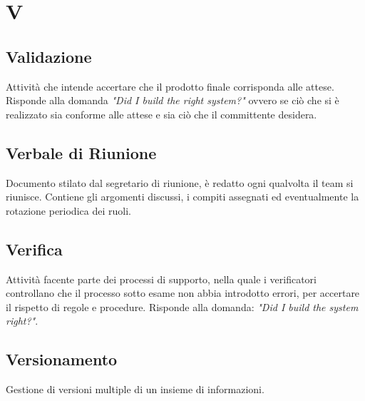 \section*{V}

\subsection{Validazione}
Attività che intende accertare che il prodotto finale corrisponda alle attese. Risponde alla domanda \textit{"Did I build the right system?"} ovvero se ciò che si è realizzato sia conforme alle attese e sia ciò che il committente desidera.

\subsection{Verbale di Riunione}
Documento stilato dal segretario di riunione, è redatto ogni qualvolta il team si riunisce. Contiene gli argomenti discussi, i compiti assegnati ed eventualmente la rotazione periodica dei ruoli.

\subsection{Verifica}
Attività facente parte dei processi di supporto, nella quale i verificatori controllano che il processo sotto esame non abbia introdotto errori, per accertare il rispetto di regole e procedure. Risponde alla domanda: \textit{"Did I build the system right?"}.

\subsection{Versionamento}
Gestione di versioni multiple di un insieme di informazioni.